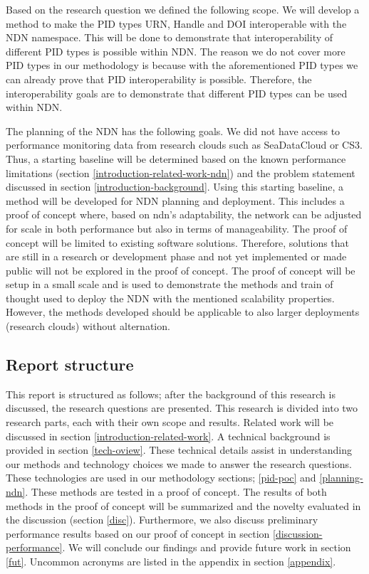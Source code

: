 
Based on the research question we defined the following scope. We will develop a method to make the PID types URN, Handle and DOI interoperable with the NDN namespace. This will be done to demonstrate that interoperability of different PID types is possible within NDN. The reason we do not cover more PID types in our methodology is because with the aforementioned PID types we can already prove that PID interoperability is possible. Therefore, the interoperability goals are to demonstrate that different PID types can be used within NDN.

The planning of the NDN has the following goals. We did not have access to performance monitoring data from research clouds such as SeaDataCloud or CS3. Thus, a starting baseline will be determined based on the known performance limitations (section \ref{introduction-related-work-ndn}) and the problem statement discussed in section \ref{introduction-background}. Using this starting baseline, a method will be developed for NDN planning and deployment. This includes a proof of concept where, based on \gls{ndn}'s adaptability, the network can be adjusted for scale in both performance but also in terms of manageability. The proof of concept will be limited to existing software solutions. Therefore, solutions that are still in a research or development phase and not yet implemented or made public will not be explored in the proof of concept. The proof of concept will be setup in a small scale and is used to demonstrate the methods and train of thought used to deploy the NDN with the mentioned scalability properties. However, the methods developed should be applicable to also larger deployments (research clouds) without alternation.

\subsection{Report structure}
This report is structured as follows; after the background of this research is discussed, the research questions are presented. This research is divided into two research parts, each with their own scope and results. Related work will be discussed in section \ref{introduction-related-work}. A technical background is provided in section \ref{tech-oview}. These technical details assist in understanding our methods and technology choices we made to answer the research questions. These technologies are used in our methodology sections; \ref{pid-poc} and \ref{planning-ndn}. These methods are tested in a proof of concept. The results of both methods in the proof of concept will be summarized and the novelty evaluated in the discussion (section \ref{disc}). Furthermore, we also discuss preliminary performance results based on our proof of concept in section \ref{discussion-performance}. We will conclude our findings and provide future work in section \ref{fut}. Uncommon acronyms are listed in the appendix in section \ref{appendix}.



